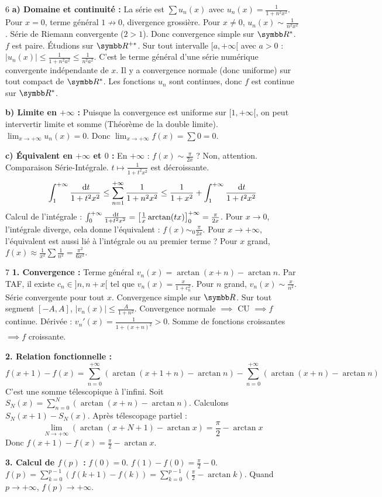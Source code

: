 \begin{correction}{6}
\textbf{a) Domaine et continuité :}
La série est $\sum u_n(x)$ avec $u_n(x) = \frac{1}{1+n^2 x^2}$.
Pour $x=0$, terme général $1 \not\to 0$, divergence grossière.
Pour $x \neq 0$, $u_n(x) \sim \frac{1}{n^2 x^2}$. Série de Riemann convergente ($2 > 1$).
Donc convergence simple sur $\R^*$.
$f$ est paire. Étudions sur $\R^{+*}$.
Sur tout intervalle $[a, +\infty[$ avec $a>0$ :
$|u_n(x)| \le \frac{1}{1+n^2 a^2} \le \frac{1}{n^2 a^2}$.
C'est le terme général d'une série numérique convergente indépendante de $x$.
Il y a convergence normale (donc uniforme) sur tout compact de $\R^*$.
Les fonctions $u_n$ sont continues, donc $f$ est continue sur $\R^*$.

\textbf{b) Limite en $+\infty$ :}
Puisque la convergence est uniforme sur $[1, +\infty[$, on peut intervertir limite et somme (Théorème de la double limite).
$\lim_{x\to +\infty} u_n(x) = 0$.
Donc $\lim_{x\to +\infty} f(x) = \sum 0 = 0$.

\textbf{c) Équivalent en $+\infty$ et $0$ :}
En $+\infty$ : $f(x) \sim \frac{\pi}{2x}$ ? Non, attention.
Comparaison Série-Intégrale. $t \mapsto \frac{1}{1+t^2 x^2}$ est décroissante.
$$ \int_1^{+\infty} \frac{\,\mathrm{d}t}{1+t^2 x^2} \le \sum_{n=1}^{+ \infty} \frac{1}{1+n^2 x^2} \le \frac{1}{1+x^2} + \int_1^{+\infty} \frac{\,\mathrm{d}t}{1+t^2 x^2} $$
Calcul de l'intégrale : $\int_0^{+\infty} \frac{\,\mathrm{d}t}{1+t^2 x^2} = \left[\frac{1}{x} \arctan(tx)\right]_0^{+\infty} = \frac{\pi}{2x}$.
Pour $x \to 0$, l'intégrale diverge, cela donne l'équivalent : $f(x) \sim_0 \frac{\pi}{2x}$.
Pour $x \to +\infty$, l'équivalent est aussi lié à l'intégrale ou au premier terme ?
Pour $x$ grand, $f(x) \approx \frac{1}{x^2} \sum \frac{1}{n^2} = \frac{\pi^2}{6 x^2}$.
\end{correction}

\begin{correction}{7}
\textbf{1. Convergence :}
Terme général $v_n(x) = \arctan(x+n) - \arctan n$.
Par TAF, il existe $c_n \in ]n, n+x[$ tel que $v_n(x) = \frac{x}{1+c_n^2}$.
Pour $n$ grand, $v_n(x) \sim \frac{x}{n^2}$. Série convergente pour tout $x$.
Convergence simple sur $\R$.
Sur tout segment $[-A, A]$, $|v_n(x)| \le \frac{A}{1+n^2}$. Convergence normale $\implies$ CU $\implies f$ continue.
Dérivée : $v_n'(x) = \frac{1}{1+(x+n)^2} > 0$. Somme de fonctions croissantes $\implies f$ croissante.

\textbf{2. Relation fonctionnelle :}
$$ f(x+1) - f(x) = \sum_{n=0}^{+ \infty} (\arctan(x+1+n) - \arctan n) - \sum_{n=0}^{+ \infty} (\arctan(x+n) - \arctan n) $$
C'est une somme télescopique à l'infini.
Soit $S_N(x) = \sum_{n=0}^N (\arctan(x+n) - \arctan n)$.
Calculons $S_N(x+1) - S_N(x)$.
Après télescopage partiel :
$$ \lim_{N\to+ \infty} (\arctan(x+N+1) - \arctan x) = \frac{\pi}{2} - \arctan x $$
Donc $f(x+1) - f(x) = \frac{\pi}{2} - \arctan x$.

\textbf{3. Calcul de $f(p)$ :}
$f(0) = 0$.
$f(1) - f(0) = \frac{\pi}{2} - 0$.
$f(p) = \sum_{k=0}^{p-1} (f(k+1)-f(k)) = \sum_{k=0}^{p-1} (\frac{\pi}{2} - \arctan k)$.
Quand $p \to + \infty$, $f(p) \to +\infty$.
\end{correction}

